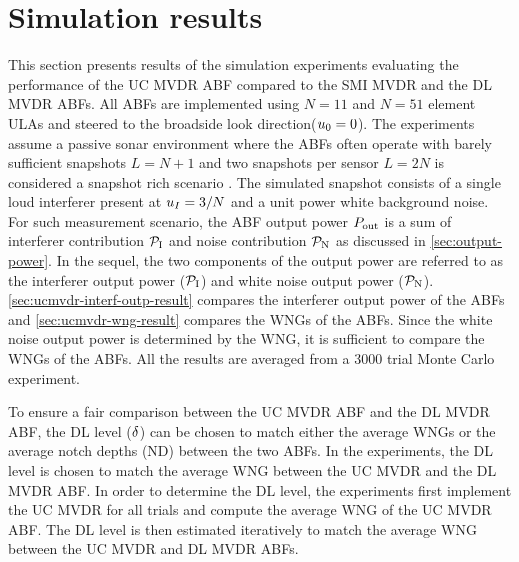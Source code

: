 \section{Simulation results}
\label{sec:ucbf-perf}
This section presents results of the simulation experiments evaluating
the performance of the UC MVDR ABF compared to the SMI MVDR and the DL
MVDR ABFs. All ABFs are implemented using $N = 11$ and $N = 51$
element ULAs and steered to the broadside look direction($u_0 =
0$). The experiments assume a passive sonar environment where the ABFs
often operate with barely sufficient snapshots $L = N + 1$ and two
snapshots per sensor $L = 2N$ is considered a snapshot rich scenario
\cite{cox2002adaptive,baggeroer1999passive}. The simulated snapshot
consists of a single loud interferer present at $u_I = 3/N$ and a
unit power white background noise. For such measurement scenario, the
ABF output power $P_{\rm out}$ is a sum of interferer contribution $\mathcal{P}_{\rm I}$
and noise contribution $\mathcal{P}_{\rm N}$ as discussed in
\sect{}\ref{sec:output-power}. In the sequel, the two components of
the output power are referred to as the interferer output power
($\mathcal{P}_{\rm I}$) and white noise output power
($\mathcal{P}_{\rm N}$). \sect{}\ref{sec:ucmvdr-interf-outp-result} compares the
interferer output power of the ABFs and
\sect{}\ref{sec:ucmvdr-wng-result} compares the WNGs of the
ABFs. Since the white noise output power is determined by the WNG, it
is sufficient to compare the WNGs of the ABFs. All the results are
averaged from a 3000 trial Monte Carlo experiment.




To ensure a fair comparison between the UC MVDR ABF and the DL MVDR
ABF, the DL level ($\delta$) can be chosen to match either the average
WNGs or the average notch depths (ND) between the two ABFs. In the
experiments, the DL level is chosen to match the average WNG between
the UC MVDR and the DL MVDR ABF. In order to determine the DL level,
the experiments first implement the UC MVDR for all trials and compute
the average WNG of the UC MVDR ABF. The DL level is then estimated
iteratively to match the average WNG between the UC MVDR and DL MVDR
ABFs.


